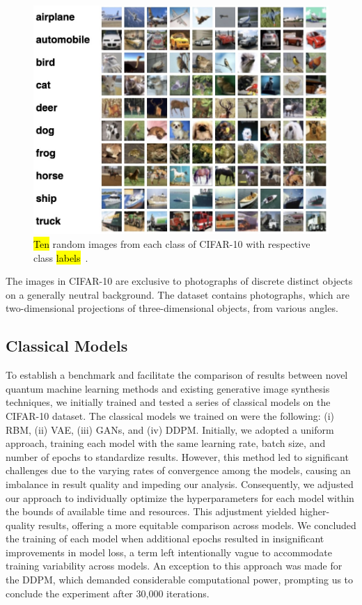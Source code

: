 \documentclass[technologies,article,accept,pdftex,moreauthors]{Definitions/mdpi}
\begin{document}
\begin{figure}[H]
    \includegraphics[width=.9\columnwidth]{cifar10.jpeg}
    \caption{\label{fig:cifar10}\hl{Ten} %
 random images from each class of CIFAR-10 with respective class \hl{labels}~\cite{CIFAR}.}
\end{figure}


The images in CIFAR-10 are exclusive to photographs of discrete distinct objects on a generally neutral background. The dataset contains photographs, which are two-dimensional projections of three-dimensional objects, from various angles.


\subsection{Classical Models}

To establish a benchmark and facilitate the comparison of results between novel quantum machine learning methods and existing generative image synthesis techniques, we initially trained and tested a series of classical models on the CIFAR-10 dataset. The classical models we trained on were the following: (i) RBM, (ii) VAE, (iii) GANs, and (iv) DDPM. Initially, we adopted a uniform approach, training each model with the same learning rate, batch size, and number of epochs to standardize results. However, this method led to significant challenges due to the varying rates of convergence among the models, causing an imbalance in result quality and impeding our analysis. Consequently, we adjusted our approach to individually optimize the hyperparameters for each model within the bounds of available time and resources. This adjustment yielded higher-quality results, offering a more equitable comparison across models. We concluded the training of each model when additional epochs resulted in insignificant improvements in model loss, a term left intentionally vague to accommodate training variability across models. An exception to this approach was made for the DDPM, which demanded considerable computational power, prompting us to conclude the experiment after 30,000 iterations.
\end{document}
